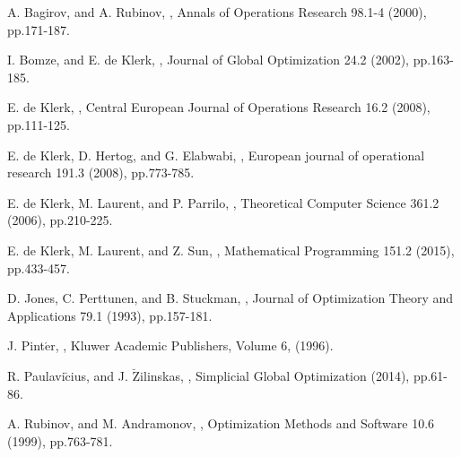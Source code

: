 \documentclass[a4paper,11pt]{jreport}
\begin{document}
\newpage

\renewcommand{\bibname}{参考文献}

\begin{thebibliography}{1}

A. Bagirov, and A. Rubinov,
,
\newblock Annals of Operations Research 98.1-4 (2000), pp.171-187.

I. Bomze, and E. de Klerk,
,
\newblock Journal of Global Optimization 24.2 (2002), pp.163-185.

E. de Klerk,
,
\newblock Central European Journal of Operations Research 16.2 (2008), pp.111-125.

E. de Klerk, D. Hertog, and G. Elabwabi,
,
\newblock European journal of operational research 191.3 (2008), pp.773-785.

E. de Klerk, M. Laurent, and P. Parrilo,
,
\newblock Theoretical Computer Science 361.2 (2006), pp.210-225.

E. de Klerk, M. Laurent, and Z. Sun,
,
\newblock Mathematical Programming 151.2 (2015), pp.433-457.

D. Jones, C. Perttunen, and B. Stuckman,
,
\newblock Journal of Optimization Theory and Applications 79.1 (1993), pp.157-181.

J. Pint$\acute{\mbox{e}}$r,
,
\newblock Kluwer Academic Publishers, Volume 6, (1996).

R. Paulavi$\breve{\mbox{c}}$ius, and J. $\breve{\mbox{Z}}$ilinskas,
,
\newblock Simplicial Global Optimization (2014), pp.61-86.

A. Rubinov, and M. Andramonov,
,
\newblock Optimization Methods and Software 10.6 (1999), pp.763-781.


\end{thebibliography}
\end{document}
